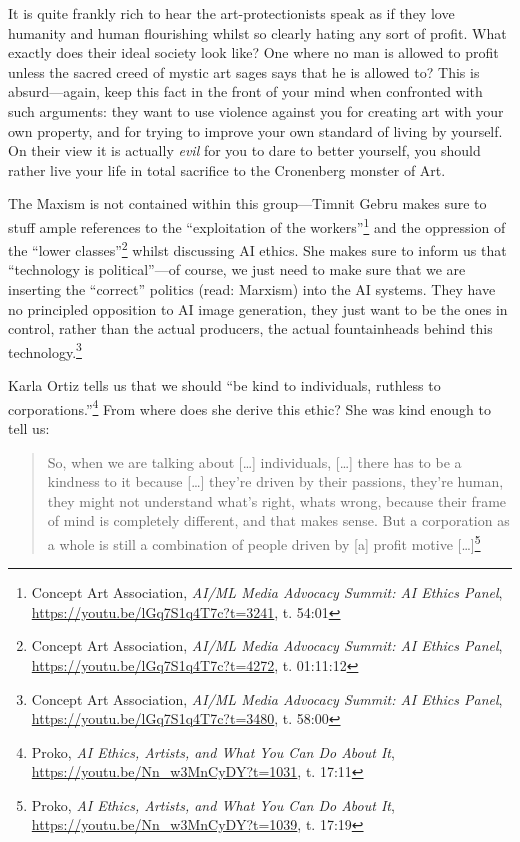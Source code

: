 \documentclass[11pt]{article}
\begin{document}
It is quite frankly rich to hear the art-protectionists speak as if they love humanity and human flourishing whilst so clearly hating any sort of profit. What exactly does their ideal society look like? One where no man is allowed to profit unless the sacred creed of mystic art sages says that he is allowed to? This is absurd---again, keep this fact in the front of your mind when confronted with such arguments: they want to use violence against you for creating art with your own property, and for trying to improve your own standard of living by yourself. On their view it is actually \emph{evil} for you to dare to better yourself, you should rather live your life in total sacrifice to the Cronenberg monster of Art.

The Maxism is not contained within this group---Timnit Gebru makes sure to stuff ample references to the ``exploitation of the workers''\footnote{Concept Art Association, \emph{AI/ML Media Advocacy Summit: AI Ethics Panel}, \url{https://youtu.be/lGq7S1q4T7c?t=3241}, t. 54:01} and the oppression of the ``lower classes''\footnote{Concept Art Association, \emph{AI/ML Media Advocacy Summit: AI Ethics Panel}, \url{https://youtu.be/lGq7S1q4T7c?t=4272}, t. 01:11:12} whilst discussing AI ethics. She makes sure to inform us that ``technology is political''---of course, we just need to make sure that we are inserting the ``correct'' politics (read: Marxism) into the AI systems. They have no principled opposition to AI image generation, they just want to be the ones in control, rather than the actual producers, the actual fountainheads behind this technology.\footnote{Concept Art Association, \emph{AI/ML Media Advocacy Summit: AI Ethics Panel}, \url{https://youtu.be/lGq7S1q4T7c?t=3480}, t. 58:00}

Karla Ortiz tells us that we should ``be kind to individuals, ruthless to corporations.''\footnote{Proko, \emph{AI Ethics, Artists, and What You Can Do About It}, \url{https://youtu.be/Nn\_w3MnCyDY?t=1031}, t. 17:11} From where does she derive this ethic? She was kind enough to tell us:

\begin{quote}
So, when we are talking about [\ldots{}] individuals, [\ldots{}] there has to be a kindness to it because [\ldots{}] they're driven by their passions, they're human, they might not understand what's right, whats wrong, because their frame of mind is completely different, and that makes sense. But a corporation as a whole is still a combination of people driven by [a] profit motive [\ldots{}]\footnote{Proko, \emph{AI Ethics, Artists, and What You Can Do About It}, \url{https://youtu.be/Nn\_w3MnCyDY?t=1039}, t. 17:19}
\end{quote}
\end{document}
